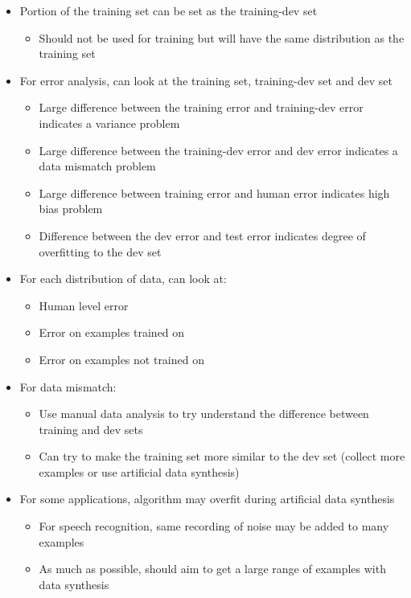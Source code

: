 \documentclass[12pt, letterpaper]{article}
\begin{document}
\begin{itemize}
        \item Portion of the training set can be set as the training-dev set
        \begin{itemize}
            \item Should not be used for training but will have the same distribution as the training set
        \end{itemize}
        \item For error analysis, can look at the training set, training-dev set and dev set
        \begin{itemize}
            \item Large difference between the training error and training-dev error indicates a variance problem
            \item Large difference between the training-dev error and dev error indicates a data mismatch problem
            \item Large difference between training error and human error indicates high bias problem
            \item Difference between the dev error and test error indicates degree of overfitting to the dev set
        \end{itemize}
        \item For each distribution of data, can look at:
        \begin{itemize}
            \item Human level error
            \item Error on examples trained on 
            \item Error on examples not trained on
        \end{itemize}
        \item For data mismatch:
        \begin{itemize}
            \item Use manual data analysis to try understand the difference between training and dev sets
            \item Can try to make the training set more similar to the dev set (collect more examples or use artificial data synthesis)
        \end{itemize}
        \item For some applications, algorithm may overfit during artificial data synthesis
        \begin{itemize}
            \item For speech recognition, same recording of noise may be added to many examples
            \item As much as possible, should aim to get a large range of examples with data synthesis
        \end{itemize}
    \end{itemize}
\end{document}
